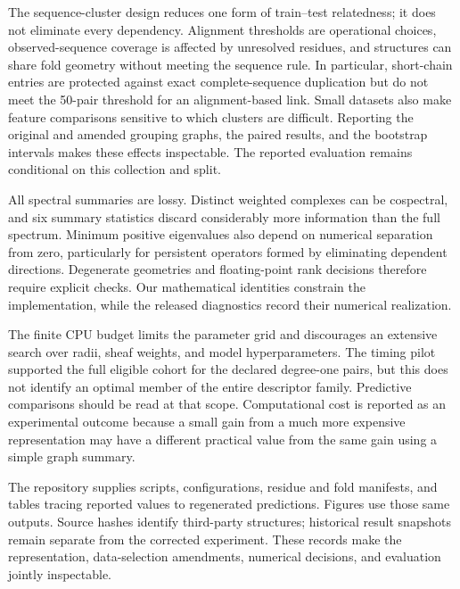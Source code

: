 \documentclass[11pt]{article}
\begin{document}
The sequence-cluster design reduces one form of train--test relatedness; it does not eliminate every dependency. Alignment thresholds are operational choices, observed-sequence coverage is affected by unresolved residues, and structures can share fold geometry without meeting the sequence rule. In particular, short-chain entries are protected against exact complete-sequence duplication but do not meet the 50-pair threshold for an alignment-based link. Small datasets also make feature comparisons sensitive to which clusters are difficult. Reporting the original and amended grouping graphs, the paired results, and the bootstrap intervals makes these effects inspectable. The reported evaluation remains conditional on this collection and split.

All spectral summaries are lossy. Distinct weighted complexes can be cospectral, and six summary statistics discard considerably more information than the full spectrum. Minimum positive eigenvalues also depend on numerical separation from zero, particularly for persistent operators formed by eliminating dependent directions. Degenerate geometries and floating-point rank decisions therefore require explicit checks. Our mathematical identities constrain the implementation, while the released diagnostics record their numerical realization.

The finite CPU budget limits the parameter grid and discourages an extensive search over radii, sheaf weights, and model hyperparameters. The timing pilot supported the full eligible cohort for the declared degree-one pairs, but this does not identify an optimal member of the entire descriptor family. Predictive comparisons should be read at that scope. Computational cost is reported as an experimental outcome because a small gain from a much more expensive representation may have a different practical value from the same gain using a simple graph summary.

The repository supplies scripts, configurations, residue and fold manifests, and tables tracing reported values to regenerated predictions. Figures use those same outputs. Source hashes identify third-party structures; historical result snapshots remain separate from the corrected experiment. These records make the representation, data-selection amendments, numerical decisions, and evaluation jointly inspectable.
\end{document}
